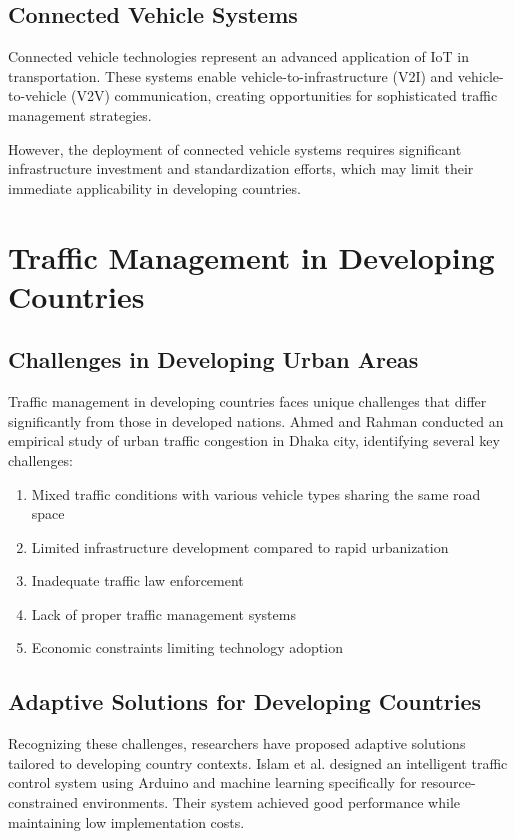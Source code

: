 \subsection{Connected Vehicle Systems}

Connected vehicle technologies represent an advanced application of IoT in transportation. These systems enable vehicle-to-infrastructure (V2I) and vehicle-to-vehicle (V2V) communication, creating opportunities for sophisticated traffic management strategies.

However, the deployment of connected vehicle systems requires significant infrastructure investment and standardization efforts, which may limit their immediate applicability in developing countries.

\section{Traffic Management in Developing Countries}

\subsection{Challenges in Developing Urban Areas}

Traffic management in developing countries faces unique challenges that differ significantly from those in developed nations. Ahmed and Rahman \cite{ahmed2019urban} conducted an empirical study of urban traffic congestion in Dhaka city, identifying several key challenges:

\begin{enumerate}
    \item Mixed traffic conditions with various vehicle types sharing the same road space
    \item Limited infrastructure development compared to rapid urbanization
    \item Inadequate traffic law enforcement
    \item Lack of proper traffic management systems
    \item Economic constraints limiting technology adoption
\end{enumerate}

\subsection{Adaptive Solutions for Developing Countries}

Recognizing these challenges, researchers have proposed adaptive solutions tailored to developing country contexts. Islam et al. \cite{islam2020design} designed an intelligent traffic control system using Arduino and machine learning specifically for resource-constrained environments. Their system achieved good performance while maintaining low implementation costs.


